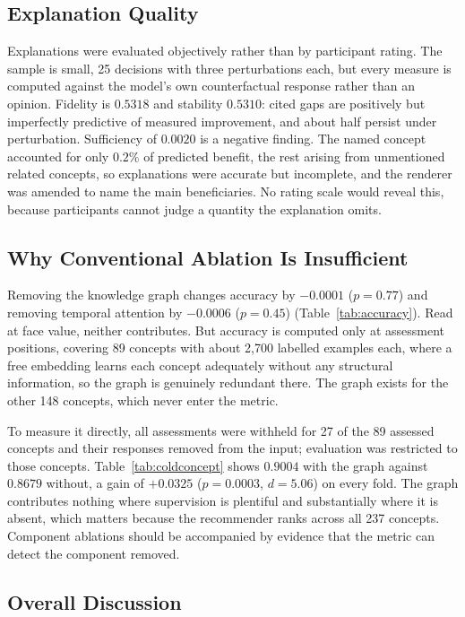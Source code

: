 \documentclass[graybox]{SNmult}
\begin{document}
\subsection{Explanation Quality}
\label{subsec:explquality}

Explanations were evaluated objectively rather than by participant rating. The sample is
small, 25 decisions with three perturbations each, but every measure is computed against
the model's own counterfactual response rather than an opinion. Fidelity is $0.5318$ and
stability $0.5310$: cited gaps are positively but imperfectly predictive of measured
improvement, and about half persist under perturbation. Sufficiency of $0.0020$ is a
negative finding. The named concept accounted for only $0.2\%$ of predicted benefit, the
rest arising from unmentioned related concepts, so explanations were accurate but
incomplete, and the renderer was amended to name the main beneficiaries. No rating scale
would reveal this, because participants cannot judge a quantity the explanation omits.

\subsection{Why Conventional Ablation Is Insufficient}
\label{subsec:ablation}

Removing the knowledge graph changes accuracy by $-0.0001$ ($p = 0.77$) and removing
temporal attention by $-0.0006$ ($p = 0.45$) (Table~\ref{tab:accuracy}). Read at face
value, neither contributes. But accuracy is computed only at assessment positions, covering
89 concepts with about 2{,}700 labelled examples each, where a free embedding learns each
concept adequately without any structural information, so the graph is genuinely redundant
there. The graph exists for the other 148 concepts, which never enter the metric.

To measure it directly, all assessments were withheld for 27 of the 89 assessed concepts
and their responses removed from the input; evaluation was restricted to those concepts.
Table~\ref{tab:coldconcept} shows $0.9004$ with the graph against $0.8679$ without, a gain
of $+0.0325$ ($p = 0.0003$, $d = 5.06$) on every fold. The graph contributes nothing where
supervision is plentiful and substantially where it is absent, which matters because the
recommender ranks across all 237 concepts. Component ablations should be accompanied by
evidence that the metric can detect the component removed.

\subsection{Overall Discussion}
\label{subsec:discussion}
\end{document}
